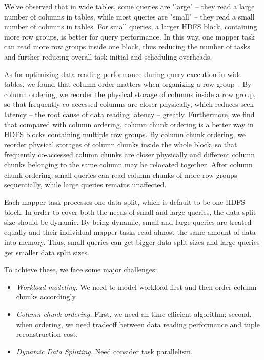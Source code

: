 We've observed that in wide tables, some queries are "large" -- they read a large number of columns in tables, while most queries are "small" -- they read a small number of columns in tables.
For small queries, a larger HDFS block, containing more row groups, is better for query performance.
In this way, one mapper task can read more row groups inside one block, thus reducing the number of tasks and further reducing overall task initial and scheduling overheads.


As for optimizing data reading performance during query execution in wide tables, we found that column order matters when organizing a row group~\cite{ColumnOrdering}.
By column ordering, we reorder the physical storage of columns inside a row group, so that frequently co-accessed columns are closer physically, which reduces seek latency -- the root cause of data reading latency -- greatly.
Furthermore, we find that compared with column ordering, column chunk ordering is a better way in HDFS blocks containing multiple row groups.
By column chunk ordering, we reorder physical storages of column chunks inside the whole block, so that frequently co-accessed column chunks are closer physically and different column chunks belonging to the same column may be relocated together.
After column chunk ordering, small queries can read column chunks of more row groups sequentially, while large queries remains unaffected.

Each mapper task processes one data split, which is default to be one HDFS block.
In order to cover both the needs of small and large queries, the data split size should be dynamic.
By being dynamic, small and large queries are treated equally and their individual mapper tasks read almost the same amount of data into memory.
Thus, small queries can get bigger data split sizes and large queries  get smaller data split sizes.

To achieve these, we face some major challenges:
\begin{itemize}
	\item \textit{Workload modeling.} We need to model workload first and then order column chunks accordingly.
	\item \textit{Column chunk ordering.} First, we need an time-efficient algorithm; second, when ordering, we need tradeoff between data reading performance and tuple reconstruction cost.
	\item \textit{Dynamic Data Splitting.} Need consider task parallelism.
\end{itemize}

